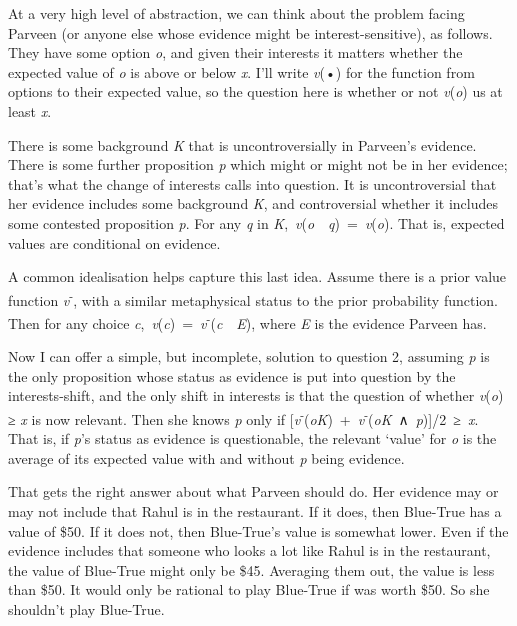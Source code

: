 \documentclass[
  10pt,
  letterpaper,
  twoside]{scrbook}
\begin{document}
At a very high level of abstraction, we can think about the problem
facing Parveen (or anyone else whose evidence might be
interest-sensitive), as follows. They have some option \emph{o}, and
given their interests it matters whether the expected value of \emph{o}
is above or below \emph{x}. I'll write \emph{v}(•) for the function from
options to their expected value, so the question here is whether or not
\emph{v}(\emph{o}) us at least \emph{x}.

There is some background \emph{K} that is uncontroversially in Parveen's
evidence. There is some further proposition \emph{p} which might or
might not be in her evidence; that's what the change of interests calls
into question. It is uncontroversial that her evidence includes some
background \emph{K}, and controversial whether it includes some
contested proposition \emph{p}. For any \emph{q} in
\emph{K},~\emph{v}(\emph{o}~\textbar~\emph{q})~=~\emph{v}(\emph{o}).
That is, expected values are conditional on evidence.

A common idealisation helps capture this last idea. Assume there is a
prior value function \emph{v}\textsuperscript{-}, with a similar
metaphysical status to the prior probability function. Then for any
choice
\emph{c},~\emph{v}(\emph{c})~=~\emph{v}\textsuperscript{-}(\emph{c}~\textbar~\emph{E}),
where \emph{E} is the evidence Parveen has.

Now I can offer a simple, but incomplete, solution to question 2,
assuming \emph{p} is the only proposition whose status as evidence is
put into question by the interests-shift, and the only shift in
interests is that the question of whether \emph{v}(\emph{o}) ≥ \emph{x}
is now relevant. Then she knows \emph{p} only if
{[}\emph{v}\textsuperscript{-}(\emph{o}\textbar{}\emph{K})~+~\emph{v}\textsuperscript{-}(\emph{o}\textbar{}\emph{K}~∧~\emph{p}){]}/2~≥~\emph{x}.
That is, if \emph{p}'s status as evidence is questionable, the relevant
`value' for \emph{o} is the average of its expected value with and
without \emph{p} being evidence.

That gets the right answer about what Parveen should do. Her evidence
may or may not include that Rahul is in the restaurant. If it does, then
Blue-True has a value of \$50. If it does not, then Blue-True's value is
somewhat lower. Even if the evidence includes that someone who looks a
lot like Rahul is in the restaurant, the value of Blue-True might only
be \$45. Averaging them out, the value is less than \$50. It would only
be rational to play Blue-True if was worth \$50. So she shouldn't play
Blue-True.
\end{document}
